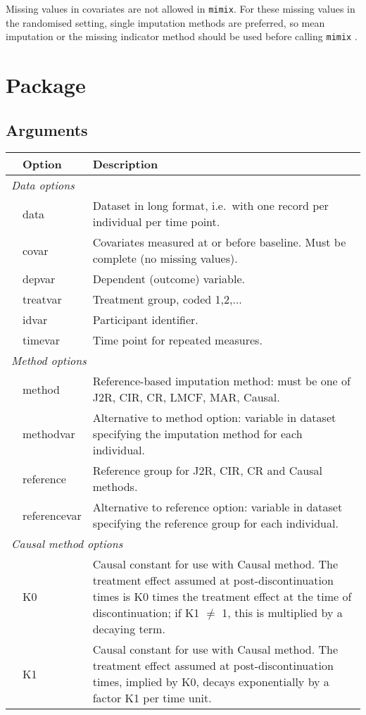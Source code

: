 Missing values in covariates are not allowed in \texttt{mimix}. For these missing values in the randomised setting, single imputation methods are preferred, so mean imputation or the missing indicator method should be used before calling \texttt{mimix} \citep{ian:MIinRCTs}.


\section{Package}

\subsection{Arguments} 

\begin{tabular}{llp{.8\linewidth}}\hline
& Option & Description \\ \hline
\multicolumn{3}{l}{\em Data options} \\
& data 	&	 Dataset in long format, i.e.\ with one record per individual per time point. \\
& covar 	&	 Covariates measured at or before baseline. Must be complete (no missing values).	\\
& depvar 	&	 Dependent (outcome) variable.	\\
& treatvar 	&	 Treatment group, coded 1,2,...	\\
& idvar 	&	 Participant identifier.	\\
& timevar 	&	 Time point for repeated measures. \\

\multicolumn{3}{l}{\em Method options} \\
& method 	&	 Reference-based imputation method: must be one of J2R, CIR, CR, LMCF, MAR, Causal.	\\
& methodvar 	&	 Alternative to method option: variable in dataset specifying the imputation method  for each individual. \\
& reference 	&	 Reference group for J2R, CIR, CR and Causal methods. \\
& referencevar 	&	 Alternative to reference option: variable in dataset specifying the reference group for each individual. \\

\multicolumn{3}{l}{\em Causal method options} \\
& K0 	&	 Causal constant for use with Causal method. The treatment effect assumed at post-discontinuation times is K0 times the treatment effect at the time of discontinuation; if K1 $\ne$ 1, this is multiplied by a decaying term. \\
& K1 	&	 Causal constant for use with Causal method. The treatment effect assumed at post-discontinuation times, implied by K0, decays exponentially by a factor K1 per time unit. \\


\end{tabular}
